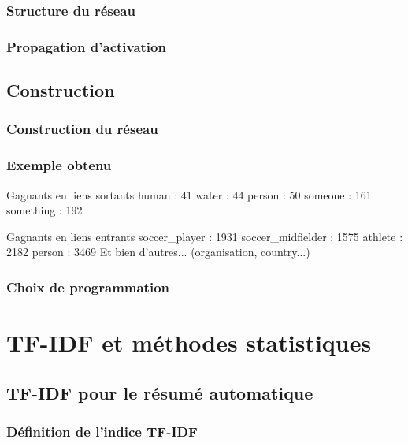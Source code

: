 \documentclass[12pt]{beamer}
\begin{document}
\begin{frame}[allowframebreaks = 0.7]
 \frametitle{Structure du réseau}
 
 
\end{frame}

\begin{frame}
 \frametitle{Propagation d'activation}
 
 
\end{frame}

\subsection{Construction}

\begin{frame}
 \frametitle{Construction du réseau}
 
 
\end{frame}

\begin{frame}
 \frametitle{Exemple obtenu}
 
 \begin{block}{Gagnants en liens sortants}
 human : 41
water : 44
person : 50
someone : 161
something : 192 
 \end{block}

 \begin{block}{Gagnants en liens entrants}
  soccer_player : 1931
soccer_midfielder : 1575
athlete : 2182
person : 3469
Et bien d'autres... (organisation, country...)
 \end{block}

\end{frame}


\begin{frame}
 \frametitle{Choix de programmation}
 
 
\end{frame}


\section{TF-IDF et méthodes statistiques}

\subsection{TF-IDF pour le résumé automatique}

\begin{frame}
 \frametitle{Définition de l'indice TF-IDF}
 
 
\end{frame}
\end{document}
